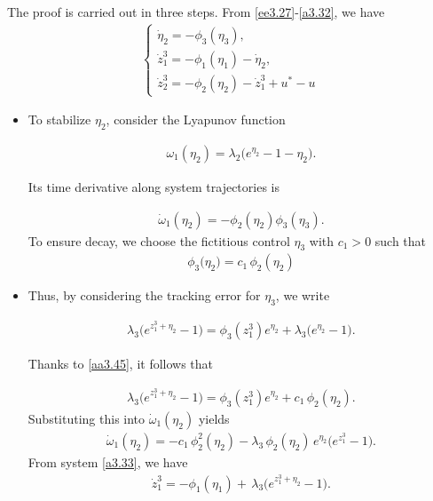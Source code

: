 \documentclass[10pt,a4paper]{amsart}
\makeatletter
\renewenvironment{proof}[1][\proofname]{\par
  \pushQED{\qed}%
  \normalfont \topsep6\p@\@plus6\p@\relax
  \trivlist
  \item[\hskip\labelsep
        \itshape
    #1\ \ref{#1}.]\ignorespaces
}{%
  \popQED\endtrivlist\@endpefalse
}
\makeatother
\begin{document}
\begin{proof}[of Theorem \ref{the3.3}] The proof is carried out in three steps. From \eqref{ee3.27}-\eqref{a3.32}, we have 
\begin{align}\label{a3.33}
\begin{cases}%
\dot\eta_2= -\phi_3(\eta_3),\\
   \dot z^3_1=-\phi_1(\eta_1)-\dot\eta_2,\\
   \dot z^3_2=- \phi_2(\eta_2)-\dot z^3_1+u^* - u 
\end{cases}
\end{align}
\begin{itemize}
\item[\bf Step (i)] To stabilize $\eta_{2}$, consider the Lyapunov function

 \begin{align}
     \omega_{1}(\eta_{2})=\lambda_{2}\bigl(e^{\eta_{2}}-1-\eta_{2}\bigr).
 \end{align}

Its time derivative along system trajectories is

 \begin{align}
\dot \omega_{1}(\eta_2)=-\phi_2(\eta_2)\phi_3(\eta_3).
 \end{align}
To ensure decay, we choose the fictitious control $\eta_3$ with $c_1 > 0$ such that
\begin{align}\label{aa3.45}
    \phi_3\big( \eta_2 \big) = c_1\,\phi_2(\eta_2) 
\end{align}

\item[\bf Step (ii)] Thus, by considering the tracking error for $\eta_3$, we write

 \begin{align}\label{a3.37}
     \lambda_3\big(e^{z^3_1+\eta_2} - 1\big) 
 = \phi_3(z^3_1) e^{\eta_2} + \lambda_3\big(e^{\eta_2} - 1\big).
 \end{align}

Thanks to \eqref{aa3.45}, it follows that

\begin{align}
     \lambda_3\big(e^{z^3_1+\eta_2} - 1\big) 
 = \phi_3(z^3_1) e^{\eta_2} + c_1\,\phi_2(\eta_2).
\end{align}
 Substituting this into $\dot \omega_1(\eta_2)$ yields
\begin{align}
\dot \omega_{1}(\eta_2)
 = -c_1\,\phi_2^2(\eta_2) - \lambda_3\,\phi_2(\eta_2)\,e^{\eta_2}\big(e^{z^3_1} - 1\big).
\end{align}
From system \eqref{a3.33}, we have
\begin{align}
 \dot z^3_1 = -\phi_1(\eta_1)
 + \,\lambda_3\big(e^{z^3_1+\eta_2}-1\big).
\end{align}


\end{itemize}
\end{proof}
\end{document}
